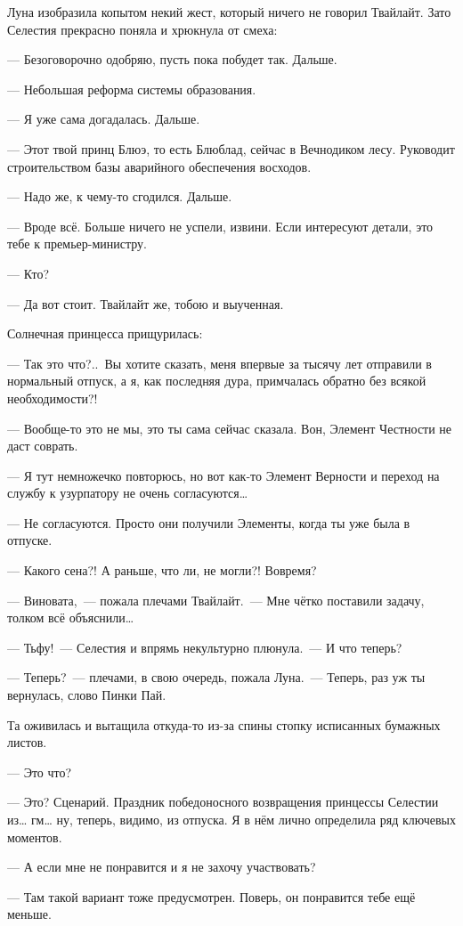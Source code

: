 \documentclass[twoside,a5paper,12pt]{extbook}
\begin{document}
Луна изобразила копытом некий жест, который ничего не говорил Твайлайт. Зато Селестия прекрасно поняла и хрюкнула от смеха:

— Безоговорочно одобряю, пусть пока побудет так. Дальше.

— Небольшая реформа системы образования.

— Я уже сама догадалась. Дальше.

— Этот твой принц Блюэ, то есть Блюблад, сейчас в Вечнодиком лесу. Руководит строительством базы аварийного обеспечения восходов.

— Надо же, к чему-то сгодился. Дальше.

— Вроде всё. Больше ничего не успели, извини. Если интересуют детали, это тебе к премьер-министру.

— Кто?

— Да вот стоит. Твайлайт же, тобою и выученная.

Солнечная принцесса прищурилась:

— Так это что?.. Вы хотите сказать, меня впервые за тысячу лет отправили в нормальный отпуск, а я, как последняя дура, примчалась обратно без всякой необходимости?!

— Вообще-то это не мы, это ты сама сейчас сказала. Вон, Элемент Честности не даст соврать.

— Я тут немножечко повторюсь, но вот как-то Элемент Верности и переход на службу к узурпатору не очень согласуются…

— Не согласуются. Просто они получили Элементы, когда ты уже была в отпуске.

— Какого сена?! А раньше, что ли, не могли?! Вовремя?

— Виновата, — пожала плечами Твайлайт. — Мне чётко поставили задачу, толком всё объяснили…

— Тьфу! — Селестия и впрямь некультурно плюнула. — И что теперь?

— Теперь? — плечами, в свою очередь, пожала Луна. — Теперь, раз уж ты вернулась, слово Пинки Пай.

Та оживилась и вытащила откуда-то из-за спины стопку исписанных бумажных листов.

— Это что?

— Это? Сценарий. Праздник победоносного возвращения принцессы Селестии из… гм… ну, теперь, видимо, из отпуска. Я в нём лично определила ряд ключевых моментов.

— А если мне не понравится и я не захочу участвовать?

— Там такой вариант тоже предусмотрен. Поверь, он понравится тебе ещё меньше.
\end{document}
